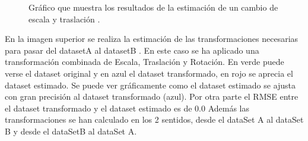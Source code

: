 \begin{figure}[H]
\begin{center}
\hspace{0.5cm}

\end{center}

\caption{Gráfico que muestra los resultados de la estimación de un cambio de escala y traslación .}
\end{figure}

En la imagen superior se realiza la estimación de las transformaciones necesarias para pasar del datasetA al datasetB . En este caso se ha aplicado una transformación combinada de Escala, Traslación y Rotación. En verde puede verse el dataset original y en azul el dataset transformado, en rojo se aprecia el dataset estimado.
Se puede ver gráficamente como el dataset estimado se ajusta con gran precisión al dataset transformado (azul).
Por otra parte el RMSE entre el dataset transformado y el dataset estimado es de 0.0
Además las transformaciones se han calculado en los 2 sentidos, desde el dataSet A  al dataSet B y desde el dataSetB al dataSet A.


